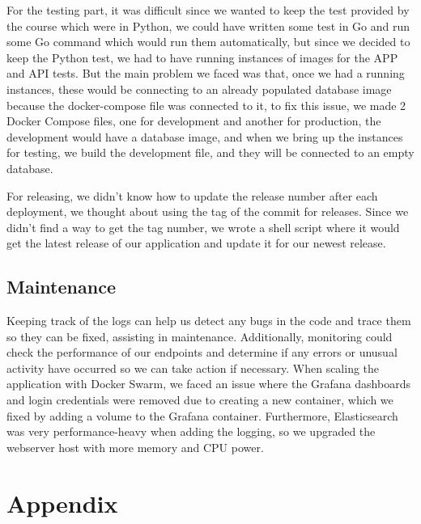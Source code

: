 \documentclass[12pt, a4paper, oneside]{book}
\begin{document}
For the testing part, it was difficult since we wanted to keep the test provided by the course which were in Python, we could have written some test in Go and run some Go command which would run them automatically, but since we decided to keep the Python test, we had to have running instances of images for the APP and API tests. But the main problem we faced was that, once we had a running instances, these would be connecting to an already populated database image because the docker-compose file was connected to it, to fix this issue, we made 2 Docker Compose files, one for development and another for production, the development would have a database image, and when we bring up the instances for testing, we build the development file, and they will be connected to an empty database. \bigskip

For releasing, we didn't know how to update the release number after each deployment, we thought about using the tag of the commit for releases. Since we didn't find a way to get the tag number, we wrote a shell script where it would get the latest release of our application and update it for our newest release.
\section{Maintenance}
Keeping track of the logs can help us detect any bugs in the code and trace them so they can be fixed, assisting in maintenance.
Additionally, monitoring could check the performance of our endpoints and determine if any errors or unusual activity have occurred so we can take action if necessary.\bigskip
When scaling the application with Docker Swarm, we faced an issue where the Grafana dashboards and login credentials were removed due to creating a new container, which we fixed by adding a volume to the Grafana container.
Furthermore, Elasticsearch was very performance-heavy when adding the logging, so we upgraded the webserver host with more memory and CPU power.





\chapter{Appendix}
\end{document}
